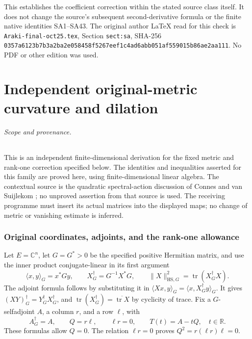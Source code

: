 This establishes the coefficient correction within the
stated source class itself. It does not change the
source's subsequent second-derivative formula or the
finite native identities SA1--SA43.
The original author LaTeX read for this check is
\texttt{Araki-final-oct25.tex}, Section \texttt{sect:sa},
SHA-256
\texttt{0357a6123b7b3a2ba2e058458f5267eef1c4ad6abb051af559015b86ae2aa111}.
No PDF or other edition was used.

\endgroup

\clearpage\begingroup
\part*{Independent original-metric curvature and dilation}
\newtheorem{samtheorem}{Theorem}
\newtheorem{samlemma}{Lemma}
\newcommand{\samtr}{\operatorname{tr}}
\newcommand{\samrank}{\operatorname{rank}}
\newcommand{\samspec}{\operatorname{spec}}
\newcommand{\samRea}{\operatorname{Re}}
\newcommand{\samIma}{\operatorname{Im}}
\newcommand{\samadj}{\dagger_G}



\paragraph{Scope and provenance.}
This is an independent finite-dimensional derivation for the fixed metric and
rank-one correction specified below. The identities and inequalities asserted
for this family are proved here, using finite-dimensional linear algebra.
The contextual source is the quadratic spectral-action
discussion of Connes and van Suijlekom \cite{sam:CvS}; no unproved assertion from that
source is used. The receiving programme must insert its actual matrices into
the displayed maps; no change of metric or vanishing estimate is inferred.

\section{Original coordinates, adjoints, and the rank-one allowance}

Let \(E=\mathbb C^n\), let \(G=G^*>0\) be the specified positive Hermitian
matrix, and use the inner product conjugate-linear in its first argument
\begin{equation}
 \langle x,y\rangle_G=x^*Gy,\qquad
 X^\samadj=G^{-1}X^*G,\qquad
 \|X\|_{\mathrm{HS},G}^2=\samtr(X^\samadj X).
 \tag{MC1}\label{sam:MC1}
\end{equation}
The adjoint formula follows by substituting it in
\(\langle Xx,y\rangle_G=\langle x,X^\samadj y\rangle_G\).
It gives \((XY)^\samadj=Y^\samadj X^\samadj\), and
\(\samtr(X^\samadj)=\overline{\samtr X}\) by cyclicity of trace.
Fix a \(G\)-selfadjoint \(A\), a column \(r\), and a row \(\ell\), with
\begin{equation}
 A^\samadj=A,\qquad Q=r\ell,\qquad \ell r=0,\qquad
 T(t)=A-tQ,\quad t\in\mathbb R.
 \tag{MC2}\label{sam:MC2}
\end{equation}
These formulas allow \(Q=0\). The relation \(\ell r=0\) proves
\(Q^2=r(\ell r)\ell=0\).

